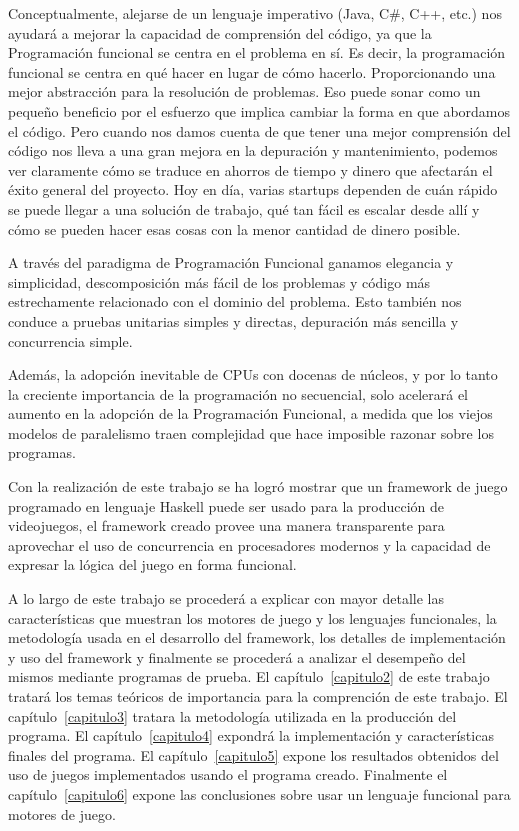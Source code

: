 Conceptualmente, alejarse de un lenguaje imperativo (Java, C\#, C++, etc.) nos ayudará a mejorar la capacidad de comprensión del código, ya que la Programación funcional se centra en el problema en sí. Es decir, la programación funcional se centra en qué hacer en lugar de cómo hacerlo. Proporcionando una mejor abstracción para la resolución de problemas. Eso puede sonar como un pequeño beneficio por el esfuerzo que implica cambiar la forma en que abordamos el código. Pero cuando nos damos cuenta de que tener una mejor comprensión del código nos lleva a una gran mejora en la depuración y mantenimiento, podemos ver claramente cómo se traduce en ahorros de tiempo y dinero que afectarán el éxito general del proyecto. Hoy en día, varias startups dependen de cuán rápido se puede llegar a una solución de trabajo, qué tan fácil es escalar desde allí y cómo se pueden hacer esas cosas con la menor cantidad de dinero posible.

A través del paradigma de Programación Funcional ganamos elegancia y simplicidad, descomposición más fácil de los problemas y código más estrechamente relacionado con el dominio del problema. Esto también nos conduce a pruebas unitarias simples y directas, depuración más sencilla y concurrencia simple.

Además, la adopción inevitable de CPUs con docenas de núcleos, y por lo tanto la creciente importancia de la programación no secuencial, solo acelerará el aumento en la adopción de la Programación Funcional, a medida que los viejos modelos de paralelismo traen complejidad que hace imposible razonar sobre los programas.

Con la realización de este trabajo se ha logró mostrar que un framework de juego programado en lenguaje Haskell puede ser usado para la producción de videojuegos, el framework creado provee una manera transparente para aprovechar el uso de concurrencia en procesadores modernos y la capacidad de expresar la lógica del juego en forma funcional.

A lo largo de este trabajo se procederá a explicar con mayor detalle las características que muestran los motores de juego y los lenguajes funcionales, la metodología usada en el desarrollo del framework, los detalles de implementación y uso del framework y finalmente se procederá a analizar el desempeño del mismos mediante programas de prueba. El capítulo~\ref{capitulo2} de este trabajo tratará los temas teóricos de importancia para la comprención de este trabajo. El capítulo~\ref{capitulo3} tratara la metodología utilizada en la producción del programa. El capítulo~\ref{capitulo4} expondrá la implementación y características finales del programa. El capítulo~\ref{capitulo5} expone los resultados obtenidos del uso de juegos implementados usando el programa creado. Finalmente el capítulo~\ref{capitulo6} expone las conclusiones sobre usar un lenguaje funcional para motores de juego.
